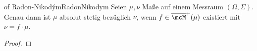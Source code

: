 \begin{msat}{of Radon-Nikodým}{RadonNikodym}
    Seien $\mu,\nu$ Maße auf einem Messraum $(\Omega,\Sigma)$. Genau dann ist $\mu$ absolut stetig bezüglich $\nu$, wenn $f\in\overline{\mcM}^+(\mu)$ existiert mit $\nu = f\cdot\mu$.
\end{msat}
\begin{proof}
    
\end{proof}
